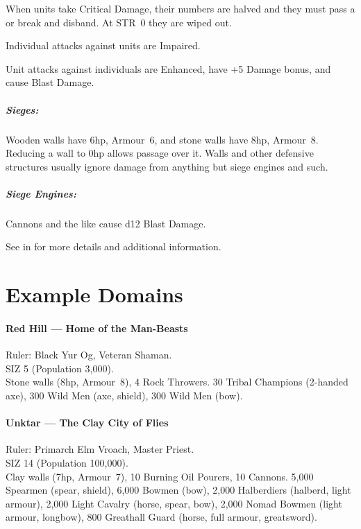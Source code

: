 \documentclass[itdr]{subfiles}
\begin{document}
When units take Critical Damage, their numbers are halved and they must pass a  or break and disband. At STR~0 they are wiped out.

Individual attacks against units are Impaired.%

Unit attacks against individuals are Enhanced, have +5 Damage bonus, and cause Blast Damage.

\subparagraph{Sieges:} Wooden walls have 6hp, Armour~6, and stone walls have 8hp, Armour~8. Reducing a wall to 0hp allows passage over it. Walls and other defensive structures usually ignore damage from anything but siege engines and such.

\subparagraph{Siege Engines:} Cannons and the like cause d12 Blast Damage.

\begin{dbox}
	See \textbf{} in \textbf{} for more details and additional information.
\end{dbox}

\vfill

\section{Example Domains}

\paragraph{Red Hill --- Home of the Man-Beasts}
Ruler: Black Yur Og, Veteran Shaman.\\
SIZ 5 (Population 3,000).\\
Stone walls (8hp, Armour~8), 4 Rock Throwers. 30 Tribal Champions (2-handed axe), 300 Wild Men (axe, shield), 300 Wild Men (bow).

\paragraph{Unktar --- The Clay City of Flies}
Ruler: Primarch Elm Vroach, Master Priest.\\
SIZ 14 (Population 100,000).\\
Clay walls (7hp, Armour~7), 10 Burning Oil Pourers, 10 Cannons. 5,000 Spearmen (spear, shield), 6,000 Bowmen (bow), 2,000 Halberdiers (halberd, light armour), 2,000 Light Cavalry (horse, spear, bow), 2,000 Nomad Bowmen (light armour, longbow), 800 Greathall Guard (horse, full armour, greatsword).

\vfill
\end{document}
